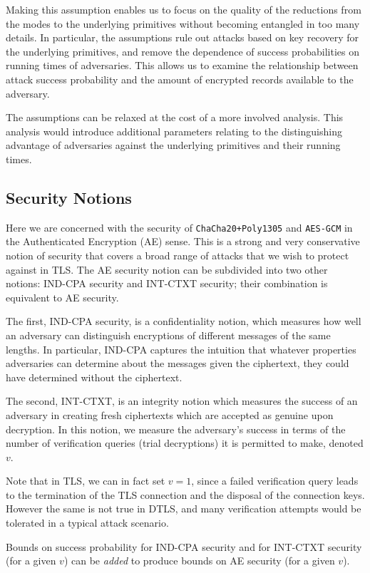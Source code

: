 \documentclass{article}
\begin{document}
Making this assumption enables us to focus on the quality of the reductions from the modes to the underlying primitives without becoming entangled in too many details. In particular, the assumptions rule out attacks based on key recovery for the underlying primitives, and remove the dependence of success probabilities on running times of adversaries. This allows us to examine the relationship between attack success probability and the amount of encrypted records available to the adversary.

The assumptions can be relaxed at the cost of a more involved analysis. This analysis would introduce additional parameters relating to the distinguishing advantage of adversaries against the underlying primitives and their running times. 

\subsection{Security Notions}

Here we are concerned with the security of \texttt{ChaCha20+Poly1305} and  \texttt{AES-GCM} in the Authenticated Encryption (AE) sense. This is a strong and very conservative notion of security that covers a broad range of attacks that we wish to protect against in TLS. The AE security notion can be subdivided into two other notions: IND-CPA security and INT-CTXT security; their combination is equivalent to AE security. 

The first, IND-CPA security, is a confidentiality notion, which measures how well an adversary can distinguish encryptions of different messages of the same lengths. In particular, IND-CPA captures the intuition that whatever properties adversaries can determine about the messages given the ciphertext, they could have determined without the ciphertext.

The second, INT-CTXT, is an integrity notion which measures the success of an adversary in creating fresh ciphertexts which are accepted as genuine upon decryption. In this notion, we measure the adversary's success in terms of the number of verification queries (trial decryptions) it is permitted to make, denoted $v$. 

Note that in TLS, we can in fact set $v=1$, since a failed verification query leads to the termination of the TLS connection and the disposal of the connection keys. However the same is not true in DTLS, and many verification attempts would be tolerated in a typical attack scenario. 

Bounds on success probability for IND-CPA security and for INT-CTXT security (for a given $v$) can be \emph{added} to produce bounds on AE security (for a given $v$).
\end{document}
